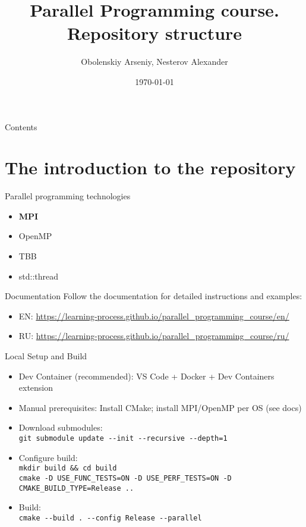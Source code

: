\documentclass{beamer}
\title[Parallel Programming. Repository structure]{Parallel Programming course. Repository structure}
\author{Obolenskiy Arseniy, Nesterov Alexander}
\institute{Nizhny Novgorod State University}
\date{\today} %
\begin{document}
\begin{frame}
    \titlepage
\end{frame}

\begin{frame}{Contents}
    \tableofcontents
\end{frame}

\section{The introduction to the repository}

\begin{frame}[fragile]{Parallel programming technologies}
  \begin{itemize}
    \item \textbf{MPI}
    \item OpenMP
    \item TBB
    \item std::thread
  \end{itemize}
\end{frame}

\begin{frame}{Documentation}
  Follow the documentation for detailed instructions and examples:
  \begin{itemize}
    \item EN: \href{https://learning-process.github.io/parallel\_programming\_course/en/}{https://learning-process.github.io/parallel\_programming\_course/en/}
    \item RU: \href{https://learning-process.github.io/parallel\_programming\_course/ru/}{https://learning-process.github.io/parallel\_programming\_course/ru/}
  \end{itemize}
\end{frame}

\begin{frame}[fragile]{Local Setup and Build}
  \begin{itemize}
    \item Dev Container (recommended): VS Code + Docker + Dev Containers extension
    \item Manual prerequisites: Install CMake; install MPI/OpenMP per OS (see docs)
    \item Download submodules: \\
      \verb|git submodule update --init --recursive --depth=1|
    \item Configure build: \\
      \verb|mkdir build && cd build| \\[-2pt]
      \verb|cmake -D USE_FUNC_TESTS=ON -D USE_PERF_TESTS=ON -D CMAKE_BUILD_TYPE=Release ..|
    \item Build: \\
      \verb|cmake --build . --config Release --parallel|
  \end{itemize}
\end{frame}
\end{document}
